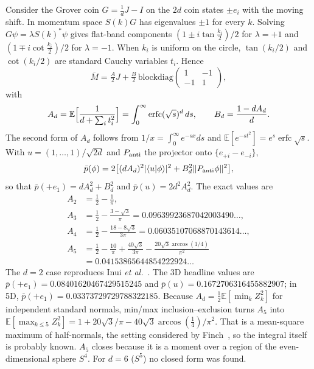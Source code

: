 \documentclass[aps,pra,10pt,twocolumn,superscriptaddress,nofootinbib]{revtex4-2}
\newcommand{\E}{\mathbb{E}}
\newcommand{\pbar}{\bar{p}}
\newcommand{\erfc}{\operatorname{erfc}}
\newcommand{\sq}{\sqrt{3}}
\begin{document}
Consider the Grover coin $G=\tfrac1dJ-I$ on the $2d$ coin states $\pm e_i$ with the moving
shift. In momentum space $S(k)G$ has eigenvalues $\pm1$ for every $k$. Solving
$G\psi=\lambda S(k)^*\psi$ gives flat-band components $(1\pm i\tan\tfrac{k_i}{2})/2$ for $\lambda=+1$
and $(1\mp i\cot\tfrac{k_i}{2})/2$ for $\lambda=-1$. When $k_i$ is uniform on the circle,
$\tan(k_i/2)$ and $\cot(k_i/2)$ are standard Cauchy variables $t_i$. Hence
\begin{equation}
\overline M=\tfrac A2J+\tfrac B2\,\mathrm{blockdiag}\begin{pmatrix}1&-1\\-1&1\end{pmatrix},
\end{equation}
with
\begin{equation}
A_d=\E\Bigl[\frac1{d+\sum_it_i^2}\Bigr]=\int_0^\infty\erfc(\sqrt s)^d\,ds,
\qquad B_d=\frac{1-dA_d}{d}.
\label{eq:Ad}
\end{equation}
The second form of $A_d$ follows from $1/x=\int_0^\infty e^{-sx}ds$ and
$\E[e^{-st^2}]=e^s\erfc\sqrt s$. With $u=(1,\dots,1)/\sqrt{2d}$ and $P_{\rm anti}$ the projector
onto $\{e_{+i}-e_{-i}\}$,
\begin{equation}
\pbar(\phi)=2\bigl[(dA_d)^2|\langle u|\phi\rangle|^2+B_d^2\|P_{\rm anti}\phi\|^2\bigr],
\end{equation}
so that $\pbar(+e_1)=dA_d^2+B_d^2$ and $\pbar(u)=2d^2A_d^2$. The exact values are
\begin{align}
A_2&=\tfrac12-\tfrac1\pi,\\
A_3&=\tfrac12-\tfrac{3-\sq}{\pi}=0.09639923687042003490\ldots,\\
A_4&=\tfrac12-\tfrac{18-8\sq}{3\pi}=0.06035107068870143614\ldots,\\
A_5&=\tfrac12-\tfrac{10}\pi+\tfrac{40\sq}{3\pi}-\tfrac{20\sq\arccos(1/4)}{\pi^2}\nonumber\\
&=0.04153865644854222924\ldots
\end{align}
The $d=2$ case reproduces Inui \emph{et al.}~\cite{Inui2004}. The 3D headline values are
$\pbar(+e_1)=0.08401620467429515245$ and $\pbar(u)=0.1672706316455882907$; in 5D,
$\pbar(+e_1)=0.03373729729788322185$. Because $A_d=\tfrac12\E[\min_kZ_k^2]$ for independent standard
normals, min/max inclusion--exclusion turns $A_5$ into
$\E[\max_{k\le5}Z_k^2]=1+20\sq/\pi-40\sq\arccos(\tfrac14)/\pi^2$. That is a mean-square maximum of
half-normals, the setting considered by Finch~\cite{Finch2011}, so the integral itself is probably
known. $A_5$ closes because it is a moment over a region of the even-dimensional
sphere $S^4$. For $d=6$ ($S^5$) no closed form was found.
\end{document}
